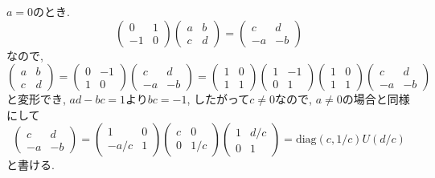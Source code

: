 $a=0$のとき.
\[
\begin{pmatrix}0&1\\-1&0\end{pmatrix}\begin{pmatrix}a&b\\c&d\end{pmatrix}
=\begin{pmatrix}c&d\\-a&-b\end{pmatrix}
\]
なので,
\[
\begin{pmatrix}a&b\\c&d\end{pmatrix}
=\begin{pmatrix}0&-1\\1&0\end{pmatrix}\begin{pmatrix}c&d\\-a&-b\end{pmatrix}
=\begin{pmatrix}1&0\\1&1\end{pmatrix}\begin{pmatrix}1&-1\\0&1\end{pmatrix}
\begin{pmatrix}1&0\\1&1\end{pmatrix}\begin{pmatrix}c&d\\-a&-b\end{pmatrix}
\]
と変形でき, $ad-bc=1$より$bc=-1$, したがって$c\neq 0$なので, $a\neq 0$の場合と同様にして
\[
\begin{pmatrix}c&d\\-a&-b\end{pmatrix}=\begin{pmatrix}1&0\\-a/c&1\end{pmatrix}
\begin{pmatrix}c&0\\0&1/c\end{pmatrix}\begin{pmatrix}1&d/c\\0&1\end{pmatrix}
=\mathrm{diag}(c, 1/c) U(d/c)
\]
と書ける.
